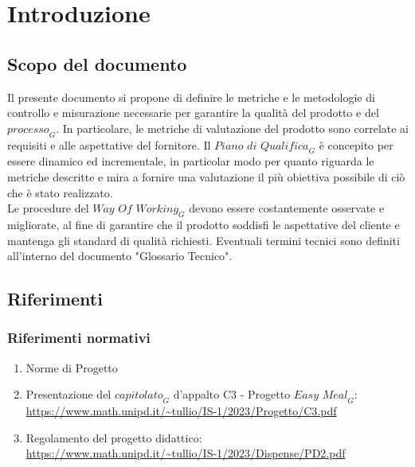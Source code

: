 \section{Introduzione}
\subsection{Scopo del documento}
Il presente documento si propone di definire le metriche e le metodologie di controllo e misurazione necessarie per garantire la qualità del prodotto e del $\textit{processo}_G$. In particolare, le metriche di valutazione del prodotto sono correlate ai requisiti e alle aspettative del fornitore.
Il $\textit{Piano di Qualifica}_G$ è concepito per essere dinamico ed incrementale, in particolar modo per quanto riguarda le metriche descritte e mira a fornire una valutazione il più obiettiva possibile di ciò che è stato realizzato.\\
Le procedure del $\textit{Way Of Working}_G$ devono essere costantemente osservate e migliorate, al fine di garantire che il prodotto soddisfi le aspettative del cliente e mantenga gli standard di qualità richiesti. Eventuali termini tecnici sono definiti all'interno del documento "Glossario Tecnico".

\subsection{Riferimenti}
\subsubsection{Riferimenti normativi}
\begin{enumerate}
    \item Norme di Progetto
    \item Presentazione del $\textit{capitolato}_G$ d'appalto C3 - Progetto $\textit{Easy Meal}_G$: \\ 
    \url{https://www.math.unipd.it/~tullio/IS-1/2023/Progetto/C3.pdf}
    \item Regolamento del progetto didattico: \\ 
    \url{https://www.math.unipd.it/~tullio/IS-1/2023/Dispense/PD2.pdf}
\end{enumerate}
